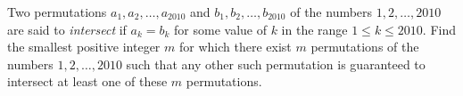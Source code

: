Two permutations $a_1,a_2,\ldots,a_{2010}$ and $b_1,b_2,\ldots,b_{2010}$ of the numbers $1,2,\ldots,2010$ are said to \emph{intersect} if $a_k=b_k$ for some value of $k$ in the range $1\leq k\leq2010$. Find the smallest positive integer $m$ for which there exist $m$ permutations of the numbers $1,2,\ldots,2010$ such that any other such permutation is guaranteed to intersect at least one of these $m$ permutations.